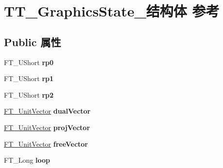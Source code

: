 \hypertarget{struct_t_t___graphics_state__}{}\section{T\+T\+\_\+\+Graphics\+State\+\_\+结构体 参考}
\label{struct_t_t___graphics_state__}
\subsection*{Public 属性}
\begin{DoxyCompactItemize}
\item 
\mbox{\label{struct_t_t___graphics_state___a359caf59279b2cc988d44266a3c44b48}} 
F\+T\+\_\+\+U\+Short {\bfseries rp0}
\item 
\mbox{\label{struct_t_t___graphics_state___ade72a46374f8869d16c8f7a8952c1d7f}} 
F\+T\+\_\+\+U\+Short {\bfseries rp1}
\item 
\mbox{\label{struct_t_t___graphics_state___aa93f489406aad906a6880dd66dbf3759}} 
F\+T\+\_\+\+U\+Short {\bfseries rp2}
\item 
\mbox{\label{struct_t_t___graphics_state___a5156622560c7aeb8c54c302c78d1e4b8}} 
\hyperlink{struct_f_t___unit_vector__}{F\+T\+\_\+\+Unit\+Vector} {\bfseries dual\+Vector}
\item 
\mbox{\label{struct_t_t___graphics_state___a928722018ef742cfaf938f20046e6e50}} 
\hyperlink{struct_f_t___unit_vector__}{F\+T\+\_\+\+Unit\+Vector} {\bfseries proj\+Vector}
\item 
\mbox{\label{struct_t_t___graphics_state___a842ea285523323ffa1c25a1f477faf27}} 
\hyperlink{struct_f_t___unit_vector__}{F\+T\+\_\+\+Unit\+Vector} {\bfseries free\+Vector}
\item 
\mbox{\label{struct_t_t___graphics_state___aae24068c1fde707ce490a4cfde3ca2cf}} 
F\+T\+\_\+\+Long {\bfseries loop}
\item 
\mbox{\label{struct_t_t___graphics_state___ad51b94592475dbbf28572af77239170f}} 

\end{DoxyCompactItemize}

